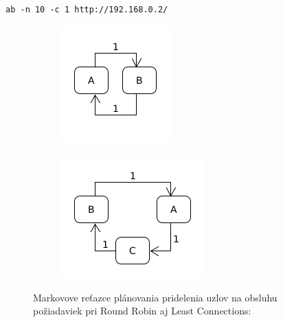 \documentclass[12pt, a4paper]{article}
\begin{document}
\begin{lrbox}{\shield}
\verb|ab -n 10 -c 1 http://192.168.0.2/|
\end{lrbox}
\begin{figure}[h!]
	\centering
	\begin{subfigure}[t]{.25\textwidth}
  		\centering
  		\includegraphics[width=\textwidth]{images/10-uzly-2.png}
	\end{subfigure}
	\begin{subfigure}[t]{.25\textwidth}
  		\centering
  		\includegraphics[width=\textwidth]{images/10-uzly-3.png}
	\end{subfigure}
	\caption{Markovove reťazce plánovania pridelenia uzlov na obsluhu požiadaviek
	pri Round Robin aj Least Connections: \usebox{\shield}}
\end{figure}
\end{document}
